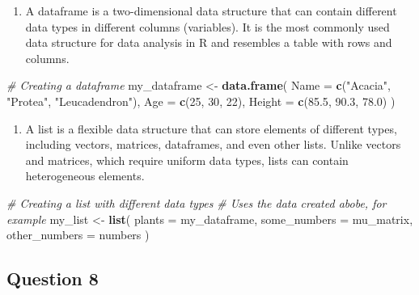 \documentclass[
  10t,
]{article}
\newenvironment{Shaded}{\begin{snugshade}}{\end{snugshade}}
\newcommand{\AttributeTok}[1]{\textcolor[rgb]{0.13,0.29,0.53}{#1}}
\newcommand{\CommentTok}[1]{\textcolor[rgb]{0.56,0.35,0.01}{\textit{#1}}}
\newcommand{\DecValTok}[1]{\textcolor[rgb]{0.00,0.00,0.81}{#1}}
\newcommand{\FloatTok}[1]{\textcolor[rgb]{0.00,0.00,0.81}{#1}}
\newcommand{\FunctionTok}[1]{\textcolor[rgb]{0.13,0.29,0.53}{\textbf{#1}}}
\newcommand{\NormalTok}[1]{#1}
\newcommand{\OtherTok}[1]{\textcolor[rgb]{0.56,0.35,0.01}{#1}}
\newcommand{\StringTok}[1]{\textcolor[rgb]{0.31,0.60,0.02}{#1}}
\providecommand{\tightlist}{%
  \setlength{\itemsep}{0pt}\setlength{\parskip}{0pt}}\usepackage{longtable,booktabs,array}
\begin{document}
\begin{enumerate}
\def\labelenumi{(\alph{enumi})}
\setcounter{enumi}{2}
\tightlist
\item
  A dataframe is a two-dimensional data structure that can contain
  different data types in different columns (variables). It is the most
  commonly used data structure for data analysis in R and resembles a
  table with rows and columns.
\end{enumerate}

\begin{Shaded}
\begin{Highlighting}[]
\CommentTok{\# Creating a dataframe}
\NormalTok{my\_dataframe }\OtherTok{\textless{}{-}} \FunctionTok{data.frame}\NormalTok{(}
  \AttributeTok{Name =} \FunctionTok{c}\NormalTok{(}\StringTok{"Acacia"}\NormalTok{, }\StringTok{"Protea"}\NormalTok{, }\StringTok{"Leucadendron"}\NormalTok{),}
  \AttributeTok{Age =} \FunctionTok{c}\NormalTok{(}\DecValTok{25}\NormalTok{, }\DecValTok{30}\NormalTok{, }\DecValTok{22}\NormalTok{),}
  \AttributeTok{Height =} \FunctionTok{c}\NormalTok{(}\FloatTok{85.5}\NormalTok{, }\FloatTok{90.3}\NormalTok{, }\FloatTok{78.0}\NormalTok{)}
\NormalTok{)}
\end{Highlighting}
\end{Shaded}

\begin{enumerate}
\def\labelenumi{(\alph{enumi})}
\setcounter{enumi}{3}
\tightlist
\item
  A list is a flexible data structure that can store elements of
  different types, including vectors, matrices, dataframes, and even
  other lists. Unlike vectors and matrices, which require uniform data
  types, lists can contain heterogeneous elements.
\end{enumerate}

\begin{Shaded}
\begin{Highlighting}[]
\CommentTok{\# Creating a list with different data types}
\CommentTok{\# Uses the data created abobe, for example}
\NormalTok{my\_list }\OtherTok{\textless{}{-}} \FunctionTok{list}\NormalTok{(}
  \AttributeTok{plants =}\NormalTok{ my\_dataframe,}
  \AttributeTok{some\_numbers =}\NormalTok{ mu\_matrix,}
  \AttributeTok{other\_numbers =}\NormalTok{ numbers}
\NormalTok{  )}
\end{Highlighting}
\end{Shaded}

\subsection{Question 8}\label{question-8}
\end{document}
